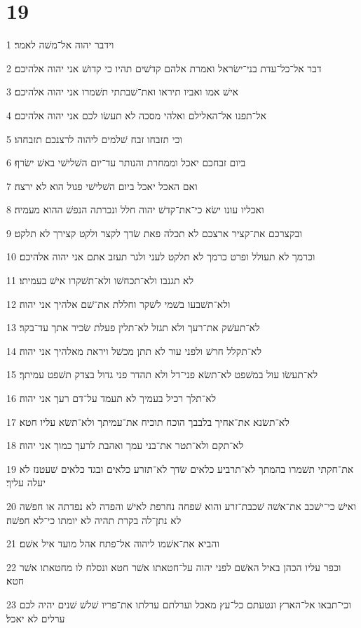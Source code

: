 \chapter{19}

\par 1 וידבר יהוה אל־משׁה לאמר׃
\par 2 דבר אל־כל־עדת בני־ישׂראל ואמרת אלהם קדשׁים תהיו כי קדושׁ אני יהוה אלהיכם׃
\par 3 אישׁ אמו ואביו תיראו ואת־שׁבתתי תשׁמרו אני יהוה אלהיכם׃
\par 4 אל־תפנו אל־האלילם ואלהי מסכה לא תעשׂו לכם אני יהוה אלהיכם׃
\par 5 וכי תזבחו זבח שׁלמים ליהוה לרצנכם תזבחהו׃
\par 6 ביום זבחכם יאכל וממחרת והנותר עד־יום השׁלישׁי באשׁ ישׂרף׃
\par 7 ואם האכל יאכל ביום השׁלישׁי פגול הוא לא ירצה׃
\par 8 ואכליו עונו ישׂא כי־את־קדשׁ יהוה חלל ונכרתה הנפשׁ ההוא מעמיה׃
\par 9 ובקצרכם את־קציר ארצכם לא תכלה פאת שׂדך לקצר ולקט קצירך לא תלקט׃
\par 10 וכרמך לא תעולל ופרט כרמך לא תלקט לעני ולגר תעזב אתם אני יהוה אלהיכם׃
\par 11 לא תגנבו ולא־תכחשׁו ולא־תשׁקרו אישׁ בעמיתו׃
\par 12 ולא־תשׁבעו בשׁמי לשׁקר וחללת את־שׁם אלהיך אני יהוה׃
\par 13 לא־תעשׁק את־רעך ולא תגזל לא־תלין פעלת שׂכיר אתך עד־בקר׃
\par 14 לא־תקלל חרשׁ ולפני עור לא תתן מכשׁל ויראת מאלהיך אני יהוה׃
\par 15 לא־תעשׂו עול במשׁפט לא־תשׂא פני־דל ולא תהדר פני גדול בצדק תשׁפט עמיתך׃
\par 16 לא־תלך רכיל בעמיך לא תעמד על־דם רעך אני יהוה׃
\par 17 לא־תשׂנא את־אחיך בלבבך הוכח תוכיח את־עמיתך ולא־תשׂא עליו חטא׃
\par 18 לא־תקם ולא־תטר את־בני עמך ואהבת לרעך כמוך אני יהוה׃
\par 19 את־חקתי תשׁמרו בהמתך לא־תרביע כלאים שׂדך לא־תזרע כלאים ובגד כלאים שׁעטנז לא יעלה עליך׃
\par 20 ואישׁ כי־ישׁכב את־אשׁה שׁכבת־זרע והוא שׁפחה נחרפת לאישׁ והפדה לא נפדתה או חפשׁה לא נתן־לה בקרת תהיה לא יומתו כי־לא חפשׁה׃
\par 21 והביא את־אשׁמו ליהוה אל־פתח אהל מועד איל אשׁם׃
\par 22 וכפר עליו הכהן באיל האשׁם לפני יהוה על־חטאתו אשׁר חטא ונסלח לו מחטאתו אשׁר חטא׃
\par 23 וכי־תבאו אל־הארץ ונטעתם כל־עץ מאכל וערלתם ערלתו את־פריו שׁלשׁ שׁנים יהיה לכם ערלים לא יאכל׃
